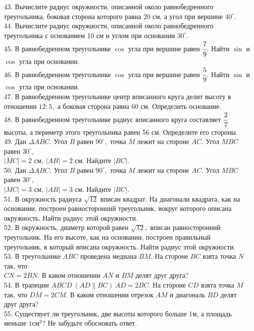 \documentclass[12pt]{article}
\begin{document}
43. Вычислите радиус окружности, описанной около равнобедренного треугольника, боковая сторона которого равна 20 см, а угол при вершине $40^\circ.$\\
44. Вычислите радиус окружности, описанной около равнобедренного треугольника с основанием 10 см и углом при основании $30^\circ.$\\
45. В равнобедренном треугольнике $\cos$ угла при вершине равен $\cfrac{7}{9}.$ Найти $\sin$ и $\cos$ угла при основании.\\
46. В равнобедренном треугольнике $\cos$ угла при вершине равен $\cfrac{5}{9}.$ Найти $\sin$ и $\cos$ угла при основании.\\
47. В равнобедренном треугольнике центр вписанного круга делит высоту в отношении $12:5,$ а боковая сторона равна 60 см. Определить основание.\\
48. В равнобедренном треугольнике радиус вписанного круга составляет $\cfrac{2}{7}$ высоты, а периметр этого треугольника равен 56 см. Определите его стороны.\\
49. Дан $\Delta ABC.$ Угол $B$ равен $90^\circ,$ точка $M$ лежит на стороне $AC.$ Угол  $MBC$ равен $30^\circ,$\\ $|MC|=2\text{ см},\ |AB|=2\text{ см}.$ Найдите $|BC|.$\\
50. Дан $\Delta ABC.$ Угол $B$ равен $90^\circ,$ точка $M$ лежит на стороне $AC.$ Угол  $MBC$ равен $30^\circ,$\\ $|MC|=3\text{ см},\ |AB|=3\text{ см}.$ Найдите $|BC|.$\\
51. В окружность радиуса $\sqrt{12}$ вписан квадрат. На диагонали квадрата, как на основании, построен равносторонний треугольник, вокруг которого описана окружность. Найти радиус этой окружности.\\
52. В окружность, диаметр которой равен $\sqrt{12},$ вписан равносторонний треугольник. На его высоте, как на основании, построен правильный треугольник, в который вписана окружность. Найти радиус этой окружности.\\
53. В треугольнике $ABC$ проведена медиана $BM.$ На стороне $BC$ взята точка $N$ так, что\\ $CN=2BN.$ В каком отношении $AN$ и $BM$ делят друг друга?\\
54. В трапеции $ABCD\ (AD\parallel BC)\ AD=2BC.$ На стороне $CD$ взята точка $M$ так, что $DM=2CM.$ В каком отношении отрезок $AM$ и диагональ $BD$ делят друг друга?\\
55. Существует ли треугольник, две высоты которого больше 1м, а площадь меньше $1\text{см}^2?$ Не забудьте обосновать ответ.\\
\end{document}
